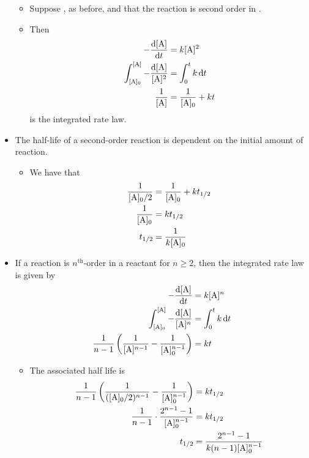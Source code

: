 \documentclass[../notes.tex]{subfiles}
\begin{document}
\begin{itemize}
    \begin{itemize}
        \item Suppose , as before, and that the reaction is second order in .
        \item Then
        \begin{align*}
            -\dv{[\ce{A}]}{t} &= k[\ce{A}]^2\\
            \int_{[\ce{A}]_0}^{[\ce{A}]}-\frac{\dd{[\ce{A}]}}{[\ce{A}]^2} &= \int_0^tk\dd{t}\\
            \frac{1}{[\ce{A}]} &= \frac{1}{[\ce{A}]_0}+kt
        \end{align*}
        is the integrated rate law.
    \end{itemize}
    \item The half-life of a second-order reaction is dependent on the initial amount of reaction.
    \begin{itemize}
        \item We have that
        \begin{align*}
            \frac{1}{[\ce{A}]_0/2} &= \frac{1}{[\ce{A}]_0}+kt_{1/2}\\
            \frac{1}{[\ce{A}]_0} &= kt_{1/2}\\
            t_{1/2} &= \frac{1}{k[\ce{A}]_0}
        \end{align*}
    \end{itemize}
    \item If a reaction is $n^\text{th}$-order in a reactant for $n\geq 2$, then the integrated rate law is given by
    \begin{align*}
        -\dv{[\ce{A}]}{t} &= k[\ce{A}]^n\\
        \int_{[\ce{A}]_0}^{[\ce{A}]}-\frac{\dd{[\ce{A}]}}{[\ce{A}]^n} &= \int_0^tk\dd{t}\\
        \frac{1}{n-1}\left( \frac{1}{[\ce{A}]^{n-1}}-\frac{1}{[\ce{A}]_0^{n-1}} \right) &= kt
    \end{align*}
    \begin{itemize}
        \item The associated half life is
        \begin{align*}
            \frac{1}{n-1}\left( \frac{1}{([\ce{A}]_0/2)^{n-1}}-\frac{1}{[\ce{A}]_0^{n-1}} \right) &= kt_{1/2}\\
            \frac{1}{n-1}\cdot\frac{2^{n-1}-1}{[\ce{A}]_0^{n-1}} &= kt_{1/2}\\
            t_{1/2} &= \frac{2^{n-1}-1}{k(n-1)[\ce{A}]_0^{n-1}}
        \end{align*}

\end{itemize}
\end{itemize}
\end{document}
